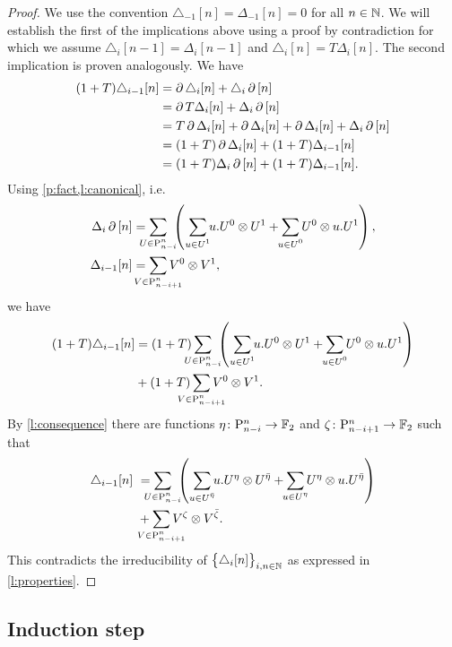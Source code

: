 \begin{proof}
	We use the convention $\triangle_{-1} [n] = \Delta_{-1} [n] = 0$ for all $n \in \mathbb{N}$.
	We will establish the first of the implications above using a proof by contradiction for which we assume $\triangle_i [n-1] = \Delta_i [n-1]$ and $\triangle_i [n] = T \Delta_i [n]$.
	The second implication is proven analogously.
	We have
	\begin{align*}
	(1+T) \triangle_{i-1}[n] &=
	\operatorname{\partial} \triangle_i [n] + \triangle_i \operatorname{\partial} \, [n] \\ &=
	\operatorname{\partial} T \Delta_i [n] + \Delta_i \operatorname{\partial} \, [n] \\ &=
	T \operatorname{\partial} \Delta_i [n] + \operatorname{\partial} \Delta_i [n] + \operatorname{\partial} \Delta_i [n] + \Delta_i \operatorname{\partial} \, [n] \\ &=
	(1+T) \operatorname{\partial} \Delta_i [n] + (1+T) \Delta_{i-1} [n] \\ &=
	(1+T) \Delta_i \operatorname{\partial} \, [n] + (1+T) \Delta_{i-1} [n].
	\end{align*}
	Using \cref{p:fact,l:canonical}, i.e.
	\[
	\begin{split}
	\Delta_i \bd \, [n] &=
	\sum_{\mathclap{U \in \P_{n-i}^n}} \
	\left(\
	\sum_{\mathclap{u \in U^1}} u.U^0 \ot U^1 +
	\sum_{\mathclap{u \in U^0}} U^0 \ot u.U^1
	\right), \\
	\Delta_{i-1} [n] &=
	\sum_{\mathclap{V \in \P_{n-i+1}^n}} V^0 \ot V^1,
	\end{split}
	\]
	we have
	\begin{align*}
	(1+T) \triangle_{i-1}[n] &=
	(1+T) \sum_{\mathclap{U \in \P_{n-i}^n}} \
	\left(\
	\sum_{\mathclap{u \in U^1}} u.U^0 \ot U^1 +
	\sum_{\mathclap{u \in U^0}} U^0 \ot u.U^1
	\right) \\ &+
	(1+T) \sum_{\mathclap{V \in \P_{n-i+1}^n}} V^0 \ot V^1.
	\end{align*}
	By \cref{l:consequence} there are functions $\eta \colon \mathrm{P}_{n-i}^n \to {\mathbb{F}_2}$ and $\zeta \colon \mathrm{P}_{n-i+1}^n \to {\mathbb{F}_2}$ such that
	\begin{align*}
	\triangle_{i-1}[n] \ &=
	\sum_{\mathclap{U \in \P_{n-i}^n}} \
	\left(\
	\sum_{\mathclap{u \in U^\bareta}} u.U^\eta \ot U^\bareta +
	\sum_{\mathclap{u \in U^\eta}} U^\eta \ot u.U^\bareta
	\right) \\ &+
	\sum_{\mathclap{V \in \P_{n-i+1}^n}} V^\zeta \ot V^\barzeta.
	\end{align*}
	This contradicts the irreducibility of $\big\{ \triangle_i [n] \big\}_{i,n \in \mathbb{N}}$ as expressed in \cref{l:properties}.
\end{proof}

\subsection{Induction step} \label{ss:step}

